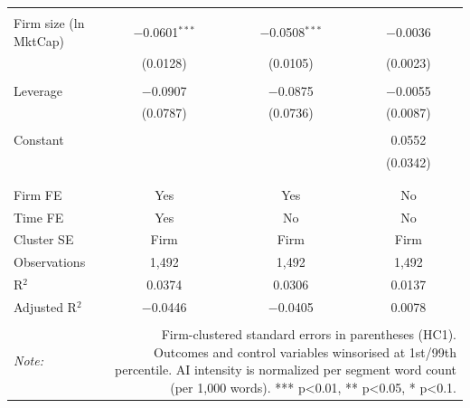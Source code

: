 \begin{table}[!htbp]
\begin{tabular}{@{\extracolsep{5pt}}lccc}
  & & & \\ 
 Firm size (ln MktCap) & $-$0.0601$^{***}$ & $-$0.0508$^{***}$ & $-$0.0036 \\ 
  & (0.0128) & (0.0105) & (0.0023) \\ 
  & & & \\ 
 Leverage & $-$0.0907 & $-$0.0875 & $-$0.0055 \\ 
  & (0.0787) & (0.0736) & (0.0087) \\ 
  & & & \\ 
 Constant &  &  & 0.0552 \\ 
  &  &  & (0.0342) \\ 
  & & & \\ 
\hline \\[-1.8ex] 
Firm FE & Yes & Yes & No \\ 
Time FE & Yes & No & No \\ 
Cluster SE & Firm & Firm & Firm \\ 
Observations & 1,492 & 1,492 & 1,492 \\ 
R$^{2}$ & 0.0374 & 0.0306 & 0.0137 \\ 
Adjusted R$^{2}$ & $-$0.0446 & $-$0.0405 & 0.0078 \\ 
\hline 
\hline \\[-1.8ex] 
\textit{Note:}  & \multicolumn{3}{r}{Firm-clustered standard errors in parentheses (HC1). Outcomes and control variables winsorised at 1st/99th percentile. AI intensity is normalized per segment word count (per 1,000 words). *** p<0.01, ** p<0.05, * p<0.1.} \\ 
\end{tabular} 
\end{table} 
